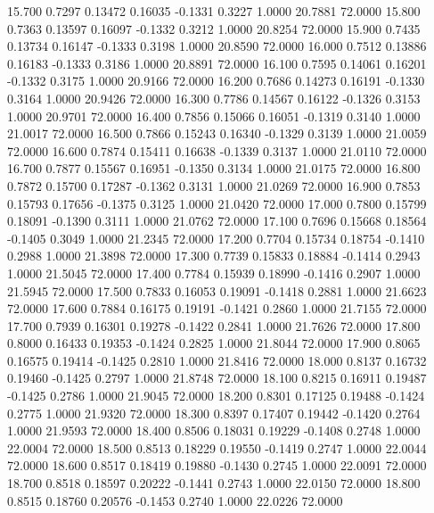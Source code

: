   15.700   0.7297   0.13472   0.16035  -0.1331   0.3227   1.0000  20.7881  72.0000
  15.800   0.7363   0.13597   0.16097  -0.1332   0.3212   1.0000  20.8254  72.0000
  15.900   0.7435   0.13734   0.16147  -0.1333   0.3198   1.0000  20.8590  72.0000
  16.000   0.7512   0.13886   0.16183  -0.1333   0.3186   1.0000  20.8891  72.0000
  16.100   0.7595   0.14061   0.16201  -0.1332   0.3175   1.0000  20.9166  72.0000
  16.200   0.7686   0.14273   0.16191  -0.1330   0.3164   1.0000  20.9426  72.0000
  16.300   0.7786   0.14567   0.16122  -0.1326   0.3153   1.0000  20.9701  72.0000
  16.400   0.7856   0.15066   0.16051  -0.1319   0.3140   1.0000  21.0017  72.0000
  16.500   0.7866   0.15243   0.16340  -0.1329   0.3139   1.0000  21.0059  72.0000
  16.600   0.7874   0.15411   0.16638  -0.1339   0.3137   1.0000  21.0110  72.0000
  16.700   0.7877   0.15567   0.16951  -0.1350   0.3134   1.0000  21.0175  72.0000
  16.800   0.7872   0.15700   0.17287  -0.1362   0.3131   1.0000  21.0269  72.0000
  16.900   0.7853   0.15793   0.17656  -0.1375   0.3125   1.0000  21.0420  72.0000
  17.000   0.7800   0.15799   0.18091  -0.1390   0.3111   1.0000  21.0762  72.0000
  17.100   0.7696   0.15668   0.18564  -0.1405   0.3049   1.0000  21.2345  72.0000
  17.200   0.7704   0.15734   0.18754  -0.1410   0.2988   1.0000  21.3898  72.0000
  17.300   0.7739   0.15833   0.18884  -0.1414   0.2943   1.0000  21.5045  72.0000
  17.400   0.7784   0.15939   0.18990  -0.1416   0.2907   1.0000  21.5945  72.0000
  17.500   0.7833   0.16053   0.19091  -0.1418   0.2881   1.0000  21.6623  72.0000
  17.600   0.7884   0.16175   0.19191  -0.1421   0.2860   1.0000  21.7155  72.0000
  17.700   0.7939   0.16301   0.19278  -0.1422   0.2841   1.0000  21.7626  72.0000
  17.800   0.8000   0.16433   0.19353  -0.1424   0.2825   1.0000  21.8044  72.0000
  17.900   0.8065   0.16575   0.19414  -0.1425   0.2810   1.0000  21.8416  72.0000
  18.000   0.8137   0.16732   0.19460  -0.1425   0.2797   1.0000  21.8748  72.0000
  18.100   0.8215   0.16911   0.19487  -0.1425   0.2786   1.0000  21.9045  72.0000
  18.200   0.8301   0.17125   0.19488  -0.1424   0.2775   1.0000  21.9320  72.0000
  18.300   0.8397   0.17407   0.19442  -0.1420   0.2764   1.0000  21.9593  72.0000
  18.400   0.8506   0.18031   0.19229  -0.1408   0.2748   1.0000  22.0004  72.0000
  18.500   0.8513   0.18229   0.19550  -0.1419   0.2747   1.0000  22.0044  72.0000
  18.600   0.8517   0.18419   0.19880  -0.1430   0.2745   1.0000  22.0091  72.0000
  18.700   0.8518   0.18597   0.20222  -0.1441   0.2743   1.0000  22.0150  72.0000
  18.800   0.8515   0.18760   0.20576  -0.1453   0.2740   1.0000  22.0226  72.0000
